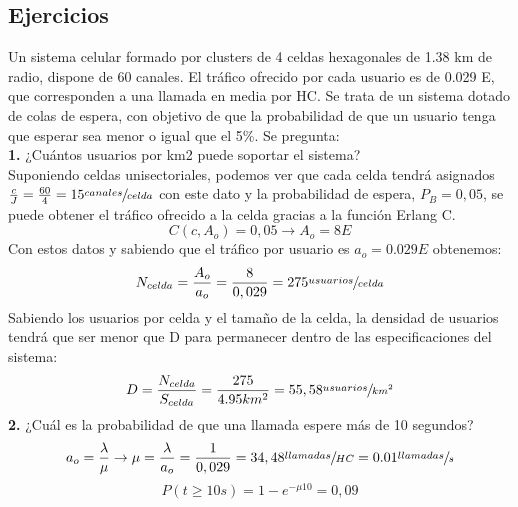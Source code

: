 \subsection{Ejercicios}
\label{sub:ejercicios4}
\begin{exercise}[1]
	Un sistema celular formado por clusters de 4 celdas hexagonales de 1.38 km de radio, dispone de 60 canales. El tráfico ofrecido por cada usuario es de 0.029 E, que corresponden a una llamada en media por HC. Se trata de un sistema dotado de colas de espera, con objetivo de que la probabilidad de que un usuario tenga que esperar sea menor o igual que el 5\%. Se pregunta: \\
	\textbf{1.} ¿Cuántos usuarios por km2 puede soportar el sistema? \\
	Suponiendo celdas unisectoriales, podemos ver que cada celda tendrá asignados $\frac{c}{J}=\frac{60}{4}=15\sfrac{canales}{celda}$ con este dato y la probabilidad de espera, $P_B=0,05$, se puede obtener el tráfico ofrecido a la celda gracias a la función Erlang C. 
	\[C(c,A_o)=0,05\to A_o=8E\]
	Con estos datos y sabiendo que el tráfico por usuario es $a_o=0.029E$ obtenemos:
	\[N_{celda}=\frac{A_o}{a_o}=\frac{8}{0,029}=275\sfrac{usuarios}{celda}\]
	Sabiendo los usuarios por celda y el tamaño de la celda, la densidad de usuarios tendrá que ser menor que D para permanecer dentro de las especificaciones del sistema:
	\[D=\frac{N_{celda}}{S_{celda}}=\frac{275}{4.95km^2}=55,58\sfrac{usuarios}{km^2}\]
	\textbf{2.} ¿Cuál es la probabilidad de que una llamada espere más de 10 segundos?
	\[a_o=\frac{\lambda}{\mu}\to \mu=\frac{\lambda}{a_o}=\frac{1}{0,029}=34,48\sfrac{llamadas}{HC}=0.01\sfrac{llamadas}{s}\]
	\[P(t\geq 10s)=1-e^{-\mu 10}=0,09\]
\end{exercise}
